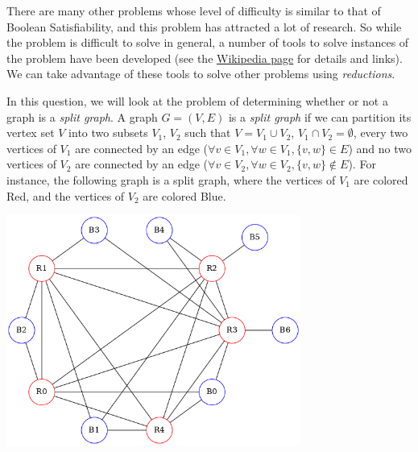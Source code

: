 There are  many other problems  whose level  of difficulty is  similar to that  of Boolean
Satisfiability, and this problem has attracted a  lot of research. So while the problem is
difficult to solve  in general, a number of  tools to solve instances of  the problem have
been                       developed                        (see                       the
\href{https://en.wikipedia.org/wiki/Boolean_satisfiability_problem}  {Wikipedia page}  for
details and  links). We can take  advantage of these  tools to solve other  problems using
\emph{reductions}.

In this question, we will  look at the problem of determining whether or  not a graph is a
\emph {split graph}. A graph $G = (V, E)$ is a \emph {split graph} if we can partition its
vertex set $V$ into two subsets $V_1$, $V_2$ such that $V = V_1 \cup V_2$, $V_1 \cap V_2 =
	\emptyset$, every  two vertices of  $V_1$ are  connected by an  edge ($\forall v  \in V_1,
	\forall w \in  V_1, \{ v, w \}  \in E$) and no  two vertices of $V_2$ are  connected by an
edge ($\forall  v \in V_2, \forall  w \in V_2,  \{ v, w  \} \notin E$). For  instance, the
following graph  is a split graph,  where the vertices of  $V_1$ are colored Red,  and the
vertices of $V_2$ are colored Blue.

\begin{center}
	\includegraphics[width=3.8in]{split-graph.png}
\end{center}

